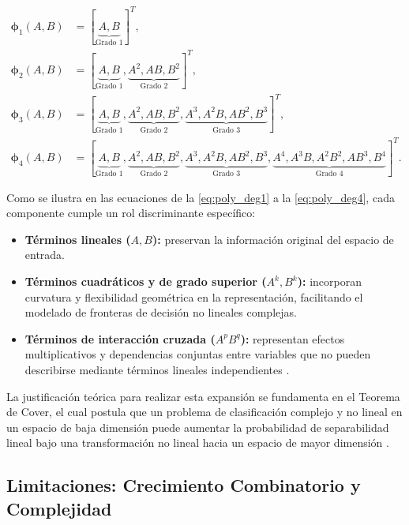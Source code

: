 \begin{align}
	\boldsymbol{\phi}_1(A, B) &= [ \underbrace{A, B}_{\text{Grado 1}} ]^T, \label{eq:poly_deg1} \\[0.5em]
	\boldsymbol{\phi}_2(A, B) &= [ \underbrace{A, B}_{\text{Grado 1}}, \underbrace{A^2, AB, B^2}_{\text{Grado 2}} ]^T, \label{eq:poly_deg2} \\[0.5em]
	\boldsymbol{\phi}_3(A, B) &= [ \underbrace{A, B}_{\text{Grado 1}}, \underbrace{A^2, AB, B^2}_{\text{Grado 2}}, \underbrace{A^3, A^2B, AB^2, B^3}_{\text{Grado 3}} ]^T, \label{eq:poly_deg3} \\[0.5em]	
	\boldsymbol{\phi}_4(A, B) &= [ \underbrace{A, B}_{\text{Grado 1}}, \underbrace{A^2, AB, B^2}_{\text{Grado 2}}, \underbrace{A^3, A^2B, AB^2, B^3}_{\text{Grado 3}}, \underbrace{A^4, A^3B, A^2B^2, AB^3, B^4}_{\text{Grado 4}} ]^T. \label{eq:poly_deg4}	
\end{align}

Como se ilustra en las ecuaciones de la \ref{eq:poly_deg1} a la \ref{eq:poly_deg4}, cada componente cumple un rol discriminante específico:

\begin{itemize}
	\item \textbf{Términos lineales ($A, B$):} preservan la información original del espacio de entrada.
	
	\item \textbf{Términos cuadráticos y de grado superior ($A^k, B^k$):} incorporan curvatura y flexibilidad geométrica en la representación, facilitando el modelado de fronteras de decisión no lineales complejas.
	
	\item \textbf{Términos de interacción cruzada ($A^p B^q$):} representan efectos multiplicativos y dependencias conjuntas entre variables que no pueden describirse mediante términos lineales independientes \cite{Murphy2012}.
	
\end{itemize}

La justificación teórica para realizar esta expansión se fundamenta en el Teorema de Cover, el cual postula que un problema de clasificación complejo y no lineal en un espacio de baja dimensión puede aumentar la probabilidad de separabilidad lineal bajo una transformación no lineal hacia un espacio de mayor dimensión \cite{cover1965geometrical}.

\subsection{Limitaciones: Crecimiento Combinatorio y Complejidad}

